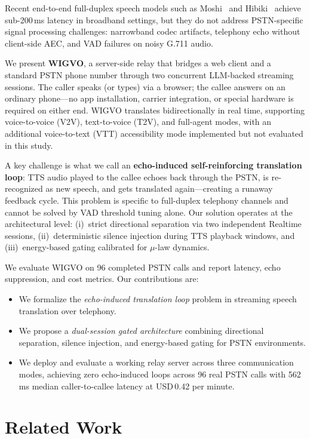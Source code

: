 \documentclass[11pt]{article}
\begin{document}
Recent end-to-end full-duplex speech models such as Moshi~\citep{defossez2024moshi} and Hibiki~\citep{labiausse2025hibiki} achieve sub-200\,ms latency in broadband settings, but they do not address PSTN-specific signal processing challenges: narrowband codec artifacts, telephony echo without client-side AEC, and VAD failures on noisy G.711 audio.

We present \textbf{WIGVO}, a server-side relay that bridges a web client and a standard PSTN phone number through two concurrent LLM-backed streaming sessions. The caller speaks (or types) via a browser; the callee answers on an ordinary phone---no app installation, carrier integration, or special hardware is required on either end. WIGVO translates bidirectionally in real time, supporting voice-to-voice (V2V), text-to-voice (T2V), and full-agent modes, with an additional voice-to-text (VTT) accessibility mode implemented but not evaluated in this study.

A key challenge is what we call an \textbf{echo-induced self-reinforcing translation loop}: TTS audio played to the callee echoes back through the PSTN, is re-recognized as new speech, and gets translated again---creating a runaway feedback cycle. This problem is specific to full-duplex telephony channels and cannot be solved by VAD threshold tuning alone. Our solution operates at the architectural level: (i)~strict directional separation via two independent Realtime sessions, (ii)~deterministic silence injection during TTS playback windows, and (iii)~energy-based gating calibrated for $\mu$-law dynamics.

We evaluate WIGVO on 96 completed PSTN calls and report latency, echo suppression, and cost metrics. Our contributions are:
\begin{itemize}
    \item We formalize the \emph{echo-induced translation loop} problem in streaming speech translation over telephony.
    \item We propose a \emph{dual-session gated architecture} combining directional separation, silence injection, and energy-based gating for PSTN environments.
    \item We deploy and evaluate a working relay server across three communication modes, achieving zero echo-induced loops across 96 real PSTN calls with 562\,ms median caller-to-callee latency at USD\,0.42 per minute.
\end{itemize}

\section{Related Work}
\end{document}
